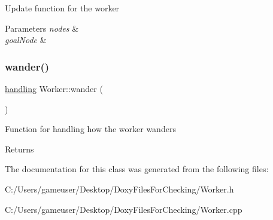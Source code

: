 Update function for the worker 


\begin{DoxyParams}{Parameters}
{\em nodes} & \\
\hline
{\em goal\+Node} & \\
\hline
\end{DoxyParams}
\mbox{\label{class_worker_afa1c335f1943af0a28fc7f458c0479b1}} 
\subsubsection{\texorpdfstring{wander()}{wander()}}
{\footnotesize\ttfamily \mbox{\hyperlink{structhandling}{handling}} Worker\+::wander (\begin{DoxyParamCaption}{ }\end{DoxyParamCaption})}



Function for handling how the worker wanders 

\begin{DoxyReturn}{Returns}

\end{DoxyReturn}


The documentation for this class was generated from the following files\+:\begin{DoxyCompactItemize}
\item 
C\+:/\+Users/gameuser/\+Desktop/\+Doxy\+Files\+For\+Checking/Worker.\+h\item 
C\+:/\+Users/gameuser/\+Desktop/\+Doxy\+Files\+For\+Checking/Worker.\+cpp\end{DoxyCompactItemize}
